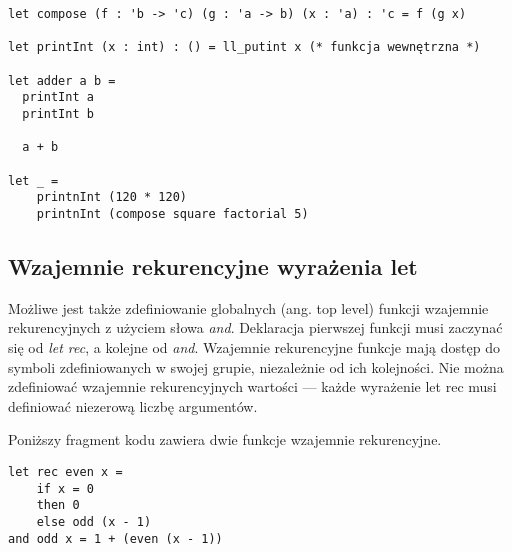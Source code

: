 \documentclass[declaration,shortabstract]{iithesis}
\begin{document}
\begin{lstlisting}[frame=lines]
let compose (f : 'b -> 'c) (g : 'a -> b) (x : 'a) : 'c = f (g x)

let printInt (x : int) : () = ll_putint x (* funkcja wewnętrzna *)

let adder a b = 
  printInt a 
  printInt b 

  a + b

let _ = 
    printnInt (120 * 120)
    printnInt (compose square factorial 5)
\end{lstlisting}




\subsection{Wzajemnie rekurencyjne wyrażenia let}

Możliwe jest także zdefiniowanie globalnych (ang. top level) funkcji wzajemnie 
rekurencyjnych z użyciem słowa \textit{and}. Deklaracja pierwszej funkcji 
musi zaczynać się od \textit{let rec}, a kolejne od \textit{and}. Wzajemnie 
rekurencyjne funkcje mają dostęp do symboli zdefiniowanych w swojej grupie,
niezależnie od ich kolejności. Nie można zdefiniować wzajemnie rekurencyjnych 
wartości --- każde wyrażenie let rec musi definiować niezerową liczbę argumentów.

Poniższy fragment kodu zawiera dwie funkcje wzajemnie rekurencyjne.

\begin{lstlisting}[frame=lines]
let rec even x = 
    if x = 0
    then 0
    else odd (x - 1)
and odd x = 1 + (even (x - 1))
\end{lstlisting}



\end{document}
